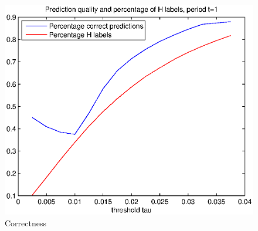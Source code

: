 \documentclass{llncs}
\begin{document}
\begin{figure}[htb!]
\caption{Correctness}
\centering%
\includegraphics[scale=0.7]{corr.eps}
\end{figure}
\end{document}
